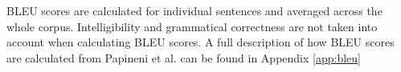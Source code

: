 \documentclass[twoside,twocolumn]{article}
\begin{document}
BLEU scores are calculated for individual sentences and averaged across the
whole corpus. Intelligibility and grammatical correctness are not taken into
account when calculating BLEU scores. A full description of how BLEU scores
are calculated from Papineni et al. \cite{papineni2002bleu} can be found in
Appendix \ref{app:bleu}
%
%
%
%
%
%
\end{document}
